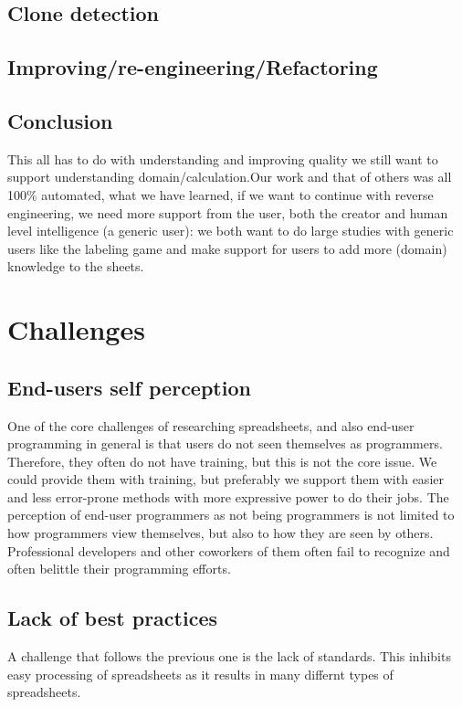 \documentclass[conference]{IEEEtran}
\begin{document}
\subsection{Clone detection}

\subsection{Improving/re-engineering/Refactoring}


\subsection{Conclusion}
This all has to do with understanding and improving quality we still want to support understanding domain/calculation.Our work and that of others was all 100\% automated, what we have learned, if we want to continue with reverse engineering, we need more support from the user, both the creator and human level intelligence (a generic user): we both want to do large studies with generic users like the labeling game and make support for users to add more (domain) knowledge to the sheets.

\section{Challenges} 

\subsection{End-users self perception}
One of the core challenges of researching spreadsheets, and also end-user programming in general is that users do not seen themselves as programmers. Therefore, they often do not have training, but this is not the core issue. We could provide them with training, but preferably we support them with easier and less error-prone methods with more expressive power to do their jobs.
The perception of end-user programmers as not being programmers is not limited to how programmers view themselves, but also to how they are seen by others. Professional developers and other coworkers of them often fail to recognize and often belittle their programming efforts.

\subsection{Lack of best practices}
A challenge that follows the previous one is the lack of standards. This inhibits easy processing of spreadsheets as it results in many differnt types of spreadsheets.
\end{document}
